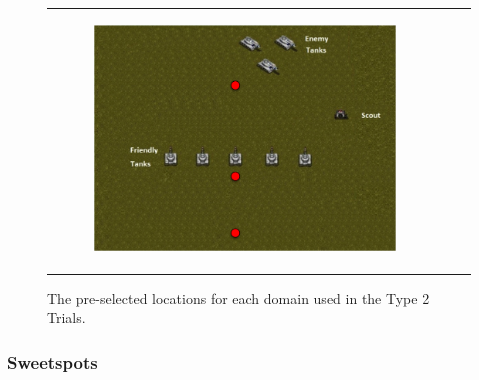 \documentclass[11pt,letterpaper]{article}
\begin{document}
\begin{figure}
{\begin{tabular}{ccc}
\begin{subfigure}[b]{0.3\textwidth}\includegraphics[width=\textwidth]{figures/tanks-close-points.png}\caption{}\label{fig:tanks-points}\end{subfigure}\\
\end{tabular}
}
\caption{The pre-selected locations for each domain used in the Type 2 Trials.}
\label{fig:locations}
\end{figure}


\subsubsection{Sweetspots}

\end{document}
